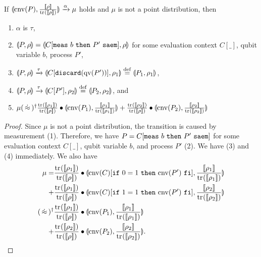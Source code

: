 \begin{lem}
 \label{symqccs:csimscon_notpoint}
 If
 $\llparenthesis \mathrm{cnv}(P), \frac{[\![\rho]\!]}{{\rm tr}_{}([\![\rho]\!])} \rrparenthesis
 \xrightarrow{\alpha}
 \mu$ holds and $\mu$ is not a point distribution, then
\begin{enumerate}
 \item $\alpha$ is $\tau$,
 \item $\llparenthesis P, \rho \rrparenthesis = \llparenthesis C[{\tt meas}~b~{\tt then}~P'~{\tt saem}], \rho \rrparenthesis$
       for some evaluation context $C[\_]$, qubit variable $b$, process
       $P'$,
 \item $\llparenthesis P, \rho \rrparenthesis 
       \xrightarrow{\tau}
       \llparenthesis C[\mathtt{discard(} \mathrm{qv}(P') \mathtt{)}], \rho_1 \rrparenthesis
       \overset{\mathrm{def}}{=} \llparenthesis P_1, \rho_1 \rrparenthesis$,
 \item $\llparenthesis P, \rho \rrparenthesis 
       \xrightarrow{\tau}
       \llparenthesis C[P'], \rho_2 \rrparenthesis \overset{\mathrm{def}}{=} \llparenthesis P_2, \rho_2 \rrparenthesis$, and
 \item $\mu (\strg)^\dagger
       \frac{\tr{}{\braw{\rho_1}}}{\tr{}{\braw{\rho}}}
       \bullet 
       \con{\cnv{P_1}}
           {\frac{\braw{\rho_1}}{\tr{}{\braw{\rho_1}}}} + 
       \frac{\tr{}{\braw{\rho_2}}}{\tr{}{\braw{\rho}}}
       \bullet 
       \con{\cnv{P_2}}
           {\frac{\braw{\rho_2}}{\tr{}{\braw{\rho_2}}}}$
\end{enumerate}
\end{lem}
\begin{proof}
 Since $\mu$ is not a point distribution, 
 the transition is caused by measurement (1).
 Therefore, we have 
 $P = C[{\tt meas}~b~{\tt then}~P'~{\tt saem}]$ for some evaluation context
 $C[\_]$, qubit variable $b$, and process $P'$ (2).
 We have (3) and (4) immediately.
 We also have
\begin{align*}
 \mu =
 &\frac{\tr{}{\braw{\rho_1}}}{\tr{}{\braw{\rho}}}
 \bullet \con{\cnv{C}[\myif{0 = 1}{\cnv{P'}}]}
              {\frac{\braw{\rho_1}}{\tr{}{\braw{\rho_1}}}}\\
 + 
 &\frac{\tr{}{\braw{\rho_1}}}{\tr{}{\braw{\rho}}}
 \bullet \con{\cnv{C}[\myif{1 = 1}{\cnv{P'}}]}
             {\frac{\braw{\rho_2}}{\tr{}{\braw{\rho_2}}}}\\
(\strg)^\dagger &
\frac{\tr{}{\braw{\rho_1}}}{\tr{}{\braw{\rho}}}
 \bullet \con{\cnv{P_1}}
              {\frac{\braw{\rho_1}}{\tr{}{\braw{\rho_1}}}}\\
 + 
 &\frac{\tr{}{\braw{\rho_2}}}{\tr{}{\braw{\rho}}}
 \bullet \con{\cnv{P_2}}
             {\frac{\braw{\rho_2}}{\tr{}{\braw{\rho_2}}}}.
\end{align*}
\end{proof}

